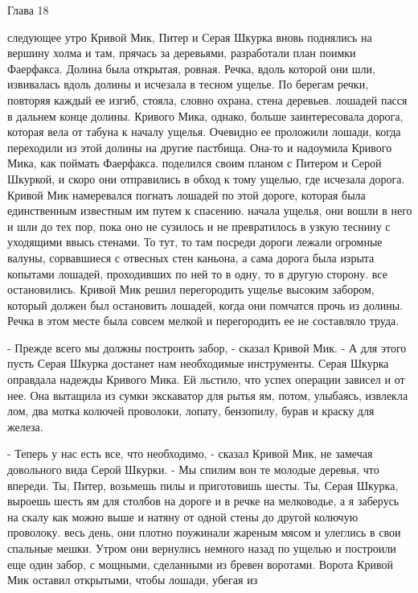 Глава 18
\par{} следующее утро Кривой Мик, Питер и Серая Шкурка вновь поднялись 
на вершину холма и там, прячась за деревьями, разработали план поимки 
Фаерфакса. Долина была открытая, ровная. Речка, вдоль которой они шли, 
извивалась вдоль долины и исчезала в тесном ущелье. По берегам речки, 
повторяя каждый ее изгиб, стояла, словно охрана, стена деревьев.
 лошадей пасся в дальнем конце долины. Кривого Мика, однако, 
больше заинтересовала дорога, которая вела от табуна к началу ущелья. 
Очевидно ее проложили лошади, когда переходили из этой долины на 
другие пастбища. Она-то и надоумила Кривого Мика, как поймать 
Фаерфакса.
 поделился своим планом с Питером и Серой Шкуркой, и скоро они 
отправились в обход к тому ущелью, где исчезала дорога. Кривой Мик 
намеревался погнать лошадей по этой дороге, которая была единственным 
известным им путем к спасению.
 начала ущелья, они вошли в него и шли до тех пор, пока 
оно не сузилось и не превратилось в узкую теснину с уходящими ввысь 
стенами. То тут, то там посреди дороги лежали огромные валуны, 
сорвавшиеся с отвесных стен каньона, а сама дорога была изрыта 
копытами лошадей, проходивших по ней то в одну, то в другую сторону.
 все остановились. Кривой Мик решил перегородить ущелье 
высоким забором, который должен был остановить лошадей, когда они 
помчатся прочь из долины. Речка в этом месте была совсем мелкой и 
перегородить ее не составляло труда.
\par- Прежде всего мы должны построить забор, - сказал Кривой Мик. - А 
для этого пусть Серая Шкурка достанет нам необходимые инструменты. 
Серая Шкурка оправдала надежды Кривого Мика. Ей льстило, что успех 
операции зависел и от нее. Она вытащила из сумки экскаватор для рытья 
ям, потом, улыбаясь, извлекла лом, два мотка колючей проволоки, 
лопату, бензопилу, бурав и краску для железа.
\par- Теперь у нас есть все, что необходимо, - сказал Кривой Мик, не 
замечая довольного вида Серой Шкурки. - Мы спилим вон те молодые 
деревья, что впереди. Ты, Питер, возьмешь пилы и приготовишь шесты. 
Ты, Серая Шкурка, выроешь шесть ям для столбов на дороге и в речке на 
мелководье, а я заберусь на скалу как можно выше и натяну от одной 
стены до другой колючую проволоку.
 весь день, они плотно поужинали жареным мясом и 
улеглись в свои спальные мешки. Утром они вернулись немного назад по 
ущелью и построили еще один забор, с мощными, сделанными из бревен 
воротами. Ворота Кривой Мик оставил открытыми, чтобы лошади, убегая из 
